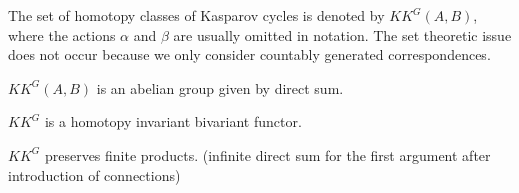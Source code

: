 \documentclass{../../large}
\begin{document}
\begin{prb}
The set of homotopy classes of Kasparov cycles is denoted by $KK^G(A,B)$, where the actions $\alpha$ and $\beta$ are usually omitted in notation.
The set theoretic issue does not occur because we only consider countably generated correspondences.

\begin{parts}
\item $KK^G(A,B)$ is an abelian group given by direct sum.
\item $KK^G$ is a homotopy invariant bivariant functor.
\item $KK^G$ preserves finite products. (infinite direct sum for the first argument after introduction of connections)
\end{parts}
\end{prb}
\end{document}
